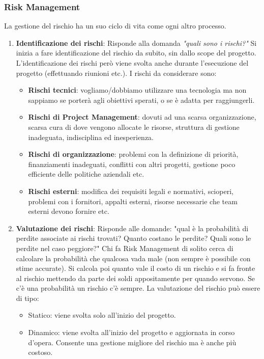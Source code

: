 \subsubsection{Risk Management}
La gestione del rischio ha un suo ciclo di vita come ogni altro processo.
\begin{enumerate}
	\item \textbf{Identificazione dei rischi}: Risponde alla domanda \textit{"quali sono i rischi?"}\newline
	Si inizia a fare identificazione del rischio da subito, sin dallo scope del progetto. L'identificazione dei rischi però viene svolta anche durante l'esecuzione del progetto (effettuando riunioni etc.). I rischi da considerare sono:
	\begin{itemize}
		\item \textbf{Rischi tecnici}: vogliamo/dobbiamo utilizzare una tecnologia ma non sappiamo se porterà agli obiettivi sperati, o se è adatta per raggiungerli.
		\item \textbf{Rischi di Project Management}: dovuti ad una scarsa organizzazione, scarsa cura di dove vengono allocate le risorse, struttura di gestione inadeguata, indisciplina ed inesperienza.
		\item \textbf{Rischi di organizzazione}: problemi con la definizione di priorità, finanziamenti inadeguati, conflitti con altri progetti, gestione poco efficiente delle politiche aziendali etc.
		\item \textbf{Rischi esterni}: modifica dei requisiti legali e normativi, scioperi, problemi con i fornitori, appalti esterni, risorse necessarie che team esterni devono fornire etc.
	\end{itemize}
	\item \textbf{Valutazione dei rischi}: Risponde alle domande: "qual è la probabilità di perdite associate ai rischi trovati? Quanto costano le perdite? Quali sono le perdite nel caso peggiore?"\newline
	Chi fa Risk Management di solito cerca di calcolare la probabilità che qualcosa vada male (non sempre è possibile con stime accurate). Si calcola poi quanto vale il costo di un rischio e si fa fronte al rischio mettendo da parte dei soldi appositamente per quando servono. Se c'è una probabilità un rischio c'è sempre. La valutazione del rischio può essere di tipo:
	\begin{itemize}
		\item Statico: viene svolta solo all'inizio del progetto.
		\item Dinamico: viene svolta all'inizio del progetto e aggiornata in corso d'opera. Consente una gestione migliore del rischio ma è anche più costoso.

\end{itemize}
\end{enumerate}
